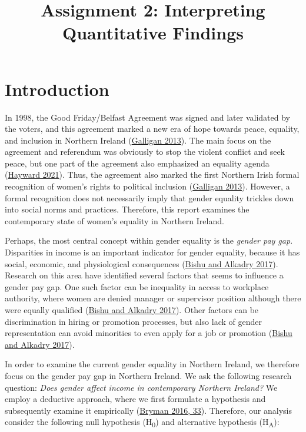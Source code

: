 \documentclass[
]{article}
\title{Assignment 2: Interpreting Quantitative Findings}
\subtitle{\hfill\break
University of Glasgow\\
\strut \\
Student ID: 2819052\\
Course: Quantitative Methods\\
Number of words: 2481}
\author{}
\date{\vspace{-2.5em}}
\begin{document}
\maketitle

\pagebreak

\setcounter{tocdepth}{2}
\tableofcontents

\pagebreak

\hypertarget{introduction}{%
\section{Introduction}\label{introduction}}

In 1998, the Good Friday/Belfast Agreement was signed and later
validated by the voters, and this agreement marked a new era of hope
towards peace, equality, and inclusion in Northern Ireland
(\protect\hyperlink{ref-galligan2013gender}{Galligan 2013}). The main
focus on the agreement and referendum was obviously to stop the violent
conflict and seek peace, but one part of the agreement also emphasized
an equality agenda (\protect\hyperlink{ref-Hayward2021}{Hayward 2021}).
Thus, the agreement also marked the first Northern Irish formal
recognition of women's rights to political inclusion
(\protect\hyperlink{ref-galligan2013gender}{Galligan 2013}). However, a
formal recognition does not necessarily imply that gender equality
trickles down into social norms and practices. Therefore, this report
examines the contemporary state of women's equality in Northern Ireland.

Perhaps, the most central concept within gender equality is the
\emph{gender pay gap}. Disparities in income is an important indicator
for gender equality, because it has social, economic, and physiological
consequences (\protect\hyperlink{ref-bishu2017gender}{Bishu and Alkadry
2017}). Research on this area have identified several factors that seems
to influence a gender pay gap. One such factor can be inequality in
access to workplace authority, where women are denied manager or
supervisor position although there were equally qualified
(\protect\hyperlink{ref-bishu2017gender}{Bishu and Alkadry 2017}). Other
factors can be discrimination in hiring or promotion processes, but also
lack of gender representation can avoid minorities to even apply for a
job or promotion (\protect\hyperlink{ref-bishu2017gender}{Bishu and
Alkadry 2017}).

In order to examine the current gender equality in Northern Ireland, we
therefore focus on the gender pay gap in Northern Ireland. We ask the
following research question: \emph{Does gender affect income in
contemporary Northern Ireland?} We employ a deductive approach, where we
first formulate a hypothesis and subsequently examine it empirically
(\protect\hyperlink{ref-bryman2016social}{Bryman 2016, 33}). Therefore,
our analysis consider the following null hypothesis (H\textsubscript{0})
and alternative hypothesis (H\textsubscript{A}):
\end{document}
